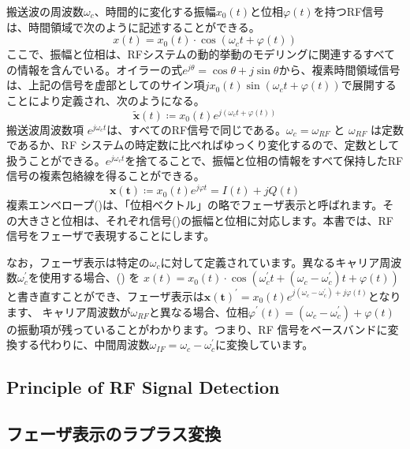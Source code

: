 \documentclass[book]{jlreq}
\begin{document}
搬送波の周波数$\omega_c$、時間的に変化する振幅$x_0(t)$と位相$\varphi(t)$を持つRF信号は、時間領域で次のように記述することができる。
%
\begin{equation}
    x(t) = x_0(t) \cdot \cos(\omega_c t + \varphi (t))
    \label{eq:signal}
\end{equation}
%
ここで、振幅と位相は、RFシステムの動的挙動のモデリングに関連するすべての情報を含んでいる。オイラーの式$e^{j\theta} = \cos\theta + j \sin\theta$から、複素時間領域信号は、上記の信号を虚部としてのサイン項$j x_0(t) \sin (\omega_c t + \varphi (t))$で展開することにより定義され、次のようになる。
%
\begin{equation}
    \tilde{\bm{x}}(t) \coloneqq x_0(t) e^{j(\omega_c t+\varphi(t))}
    \label{eq:complex}
\end{equation}
%
搬送波周波数項 $e^{j\omega_c t}$は、すべてのRF信号で同じである。$\omega_c = \omega_{RF}$ と $\omega_{RF}$ は定数であるか、RF システムの時定数に比べればゆっくり変化するので、定数として扱うことができる。$e^{j\omega_c t}$を捨てることで、振幅と位相の情報をすべて保持したRF信号の複素包絡線を得ることができる。
%
\begin{equation}
    \bm{x(t)} \coloneqq x_0(t) e^{j\varphi t} = I(t) + j Q(t)
    \label{eq:phasor} 
\end{equation}
%
複素エンベロープ()は、「位相ベクトル」の略でフェーザ表示と呼ばれます。その大きさと位相は、それぞれ信号()の振幅と位相に対応します。本書では、RF信号をフェーザで表現することにします。

なお，フェーザ表示は特定の$\omega_c$に対して定義されています。異なるキャリア周波数$\omega_c^{\prime}$を使用する場合、() を $x(t) = x_0(t)\cdot \cos(\omega_c^{\prime} t + (\omega_c - \omega_c^{\prime}) t + \varphi (t))$と書き直すことができ、フェーザ表示は$\bm{x(t)}^{\prime} = x_0(t) e^{j (\omega_c - \omega_c^{\prime}) + j \varphi (t)}$となります、
キャリア周波数が$\omega_{RF}$と異なる場合、位相$\varphi^{\prime} (t) = (\omega_c - \omega_c^{\prime}) + \varphi (t)$の振動項が残っていることがわかります。つまり、RF 信号をベースバンドに変換する代わりに、中間周波数$\omega_{IF} = \omega_c - \omega_c^{\prime}$に変換しています。

\subsection{Principle of RF Signal Detection}

\subsection{フェーザ表示のラプラス変換}
\end{document}
